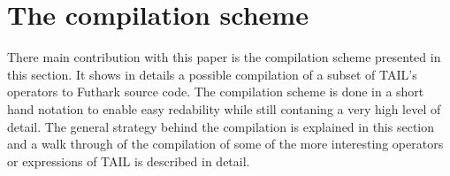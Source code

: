 \documentclass[11pt]{article}
\begin{document}

\section{The compilation scheme}
\label{sec:scheme}
There main contribution with this paper is the compilation scheme presented in this section. It shows in details a possible  compilation of a subset of TAIL's operators to Futhark source code. The compilation scheme is done in a short hand notation to enable easy redability while still contaning a very high level of detail. The general strategy behind the compilation is explained in this section and a walk through of the compilation of some of the more interesting operators or expressions of TAIL is described in detail. \\

\end{document}
